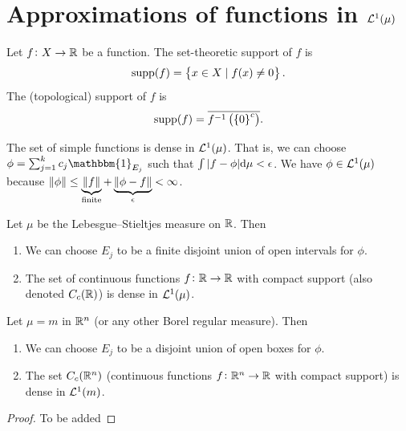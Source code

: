 \documentclass[11pt,a4paper]{article}
\begin{document}
\newpage

\section{Approximations of functions in \texorpdfstring{$\mathcal{L}^1(\mu)$}{L}}

\begin{definition}[Support]
  Let $f \colon X \to \mathbb{R}$ be a function.
  The set-theoretic support of $f$ is
  \[
    \operatorname{supp}(f) = \left\{x \in X \mid f(x) \neq 0\right\}.
  \]
  The (topological) support of $f$ is
  \[
    \supp(f) = \overline{f^{-1}\del{\set{0}^c}}.
  \]
\end{definition}

\begin{proposition}
  The set of simple functions is dense in $\mathcal{L}^1(\mu)$.
  That is,
  we can choose $\phi = \sum_{j=1}^{k} c_j \mathbbm{1}_{E_j}$ such
  that $\int |f - \phi| \mathrm{d} \mu < \epsilon$.
  We have $\phi \in \mathcal{L}^1(\mu)$ because
  $\left\lVert\phi\right\rVert \le \underbrace{\left\lVert f\right\rVert}_{\text{finite}} +
  \underbrace{\left\lVert\phi - f\right\rVert}_{\epsilon} < \infty$.
\end{proposition}

\begin{proposition}
  Let $\mu$ be the Lebesgue--Stieltjes measure on $\mathbb{R}$.
  Then
  \begin{enumerate}
    \item[(1)] We can choose $E_j$ to be a finite disjoint union of open
      intervals for $\phi$.
    \item[(2)] The set of continuous functions $f \colon \mathbb{R} \to \mathbb{R}$
      with compact support (also denoted $C_c(\mathbb{R})$) is dense in $\mathcal{L}^1(\mu)$.
  \end{enumerate}
\end{proposition}

\begin{proposition}
  Let $\mu = m$ in $\mathbb{R}^n$ (or any other Borel regular measure).
  Then
  \begin{enumerate}
    \item[(1)] We can choose $E_j$ to be a disjoint union of open boxes
      for $\phi$.
    \item[(2)] The set $C_c(\mathbb{R}^n)$
      (continuous functions $f \colon \mathbb{R}^n \to \mathbb{R}$ with compact support)
      is dense in $\mathcal{L}^1(m)$.
  \end{enumerate}
\end{proposition}
\begin{proof}
  To be added
\end{proof}
\end{document}
